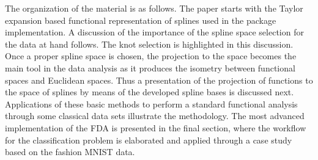The organization of the material is as follows. 
The paper starts with the Taylor expansion based functional representation of splines used in the package implementation. 
A discussion of the importance of the spline space selection for the data at hand follows. 
The knot selection is highlighted in this discussion.  
Once a proper spline space is chosen, the projection to the space becomes the main tool in the data analysis as it produces the isometry between functional spaces and  Euclidean spaces.
Thus a presentation of the projection of functions to the space of splines by means of the developed spline bases is discussed next. 
Applications of these basic methods to perform a standard functional analysis through some classical data sets illustrate the methodology. 
The most advanced implementation of the FDA is presented in the final section, where the workflow for the classification problem is elaborated and applied through a case study based on the fashion MNIST data.

\vspace{-.13cm}
